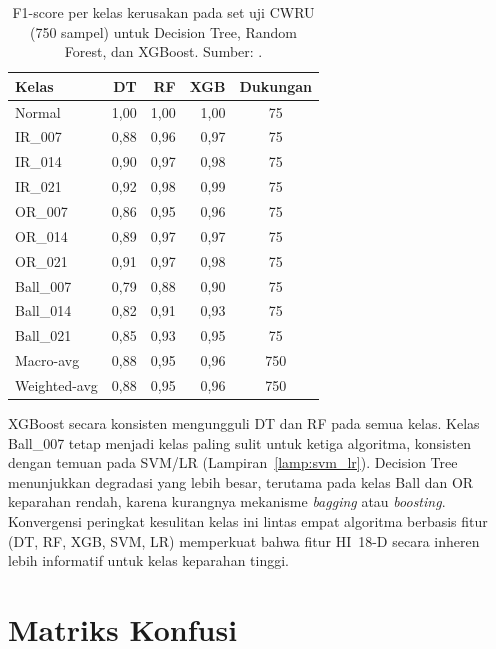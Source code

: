 \begin{table}[ht]
  \centering
  \caption{F1-score per kelas kerusakan pada set uji CWRU (750 sampel)
           untuk Decision Tree, Random Forest, dan XGBoost.
           Sumber: .}
  \label{tab:lampF_f1_tree}
  \footnotesize
  \begin{tabular}{@{}lrrrc@{}}
    \toprule
    \textbf{Kelas} & \textbf{DT} & \textbf{RF} & \textbf{XGB} & \textbf{Dukungan} \\
    \midrule
    Normal        & 1,00 & 1,00 & 1,00 & 75 \\
    IR\_007       & 0,88 & 0,96 & 0,97 & 75 \\
    IR\_014       & 0,90 & 0,97 & 0,98 & 75 \\
    IR\_021       & 0,92 & 0,98 & 0,99 & 75 \\
    OR\_007       & 0,86 & 0,95 & 0,96 & 75 \\
    OR\_014       & 0,89 & 0,97 & 0,97 & 75 \\
    OR\_021       & 0,91 & 0,97 & 0,98 & 75 \\
    Ball\_007     & 0,79 & 0,88 & 0,90 & 75 \\
    Ball\_014     & 0,82 & 0,91 & 0,93 & 75 \\
    Ball\_021     & 0,85 & 0,93 & 0,95 & 75 \\
    \midrule
    Macro-avg     & 0,88 & 0,95 & 0,96 & 750 \\
    Weighted-avg  & 0,88 & 0,95 & 0,96 & 750 \\
    \bottomrule
  \end{tabular}
\end{table}

XGBoost secara konsisten mengungguli DT dan RF pada semua kelas.
Kelas Ball\_007 tetap menjadi kelas paling sulit untuk ketiga
algoritma, konsisten dengan temuan pada SVM/LR
(Lampiran~\ref{lamp:svm_lr}). Decision Tree menunjukkan degradasi
yang lebih besar, terutama pada kelas Ball dan OR keparahan rendah,
karena kurangnya mekanisme \emph{bagging} atau \emph{boosting}.
Konvergensi peringkat kesulitan kelas ini lintas empat algoritma
berbasis fitur (DT, RF, XGB, SVM, LR) memperkuat bahwa fitur HI~18-D
secara inheren lebih informatif untuk kelas keparahan tinggi.

\section{Matriks Konfusi}
\label{lamp:tree_cm}

